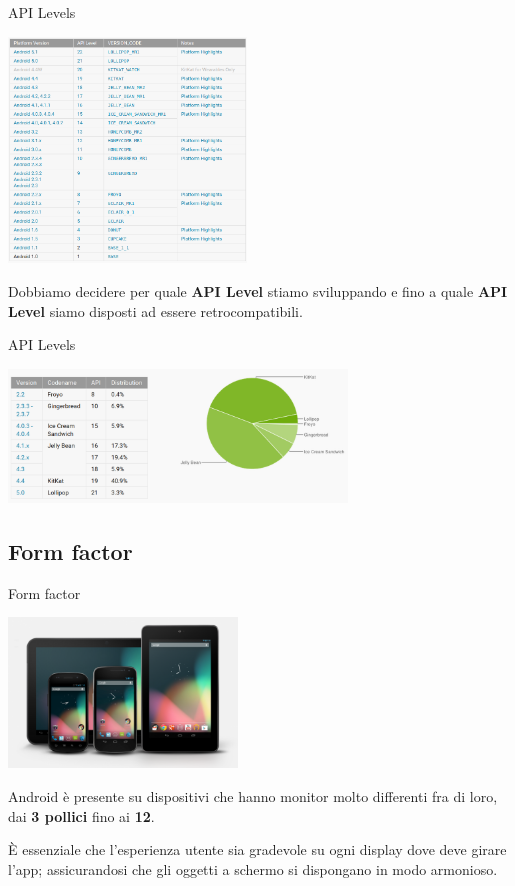 \documentclass[xcolor=svgnames,11pt]{beamer}
\begin{document}
\begin{frame}{API Levels}
\begin{center}
\includegraphics[height=6cm]{apilevel.png}
\end{center}
\pause
Dobbiamo decidere per quale \textbf{API Level} stiamo sviluppando e fino a quale \textbf{API Level} siamo disposti ad essere retrocompatibili.

\end{frame}

\begin{frame}{API Levels}

\begin{center}
\includegraphics[width=9cm]{dashboard.png}
\end{center}
\end{frame}


\subsection{Form factor}
\begin{frame}{Form factor}

\begin{center}
\includegraphics[height=4cm]{devices.png}
\end{center}

\pause

Android \`e presente su dispositivi che hanno monitor molto differenti fra di loro, dai \textbf{3 pollici} fino ai \textbf{12}.

\pause

\begin{block}{}
\`E essenziale che l'esperienza utente sia gradevole su ogni display dove deve girare l'app; assicurandosi che gli oggetti a schermo si dispongano in modo armonioso. 
\end{block}
\end{frame}
\end{document}
